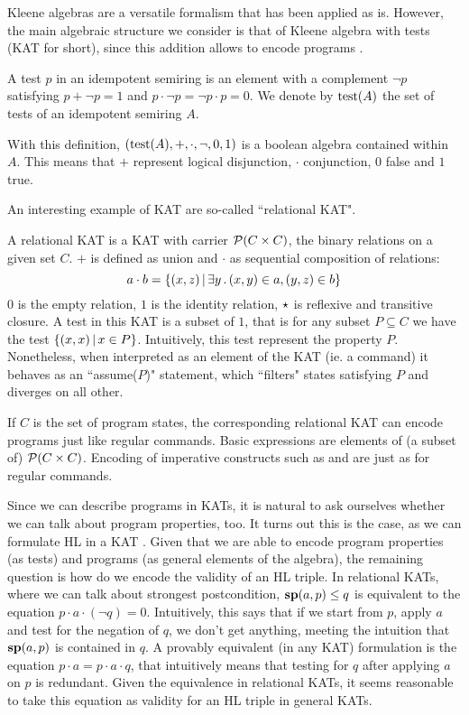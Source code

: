Kleene algebras are a versatile formalism that has been applied as is. However, the main algebraic structure we consider is that of Kleene algebra with tests (KAT for short), since this addition allows to encode programs \cite{Kozen97}.
\begin{definition}[Test]
	A test $p$ in an idempotent semiring is an element with a complement $\lnot p$ satisfying $p + \lnot p = 1$ and $p \cdot \lnot p = \lnot p \cdot p = 0$. We denote by $\text{test}(A)$ the set of tests of an idempotent semiring $A$.
\end{definition}
With this definition, $(\text{test}(A), +, \cdot, \lnot, 0, 1)$ is a boolean algebra contained within $A$. This means that $+$ represent logical disjunction, $\cdot$ conjunction, $0$ false and $1$ true.

An interesting example of KAT are so-called ``relational KAT".
\begin{example}
	A relational KAT is a KAT with carrier $\mathcal{P}(C \times C)$, the binary relations on a given set $C$. $+$ is defined as union and $\cdot$ as sequential composition of relations:
	\[
	a \cdot b = \{ (x, z) \,\vert\, \exists y \,.\, (x, y) \in a, (y, z) \in b \}
	\]
	$0$ is the empty relation, $1$ is the identity relation, $\star$ is reflexive and transitive closure. A test in this KAT is a subset of $1$, that is for any subset $P \subseteq C$ we have the test $\{ (x, x) \,\vert\, x \in P \}$. Intuitively, this test represent the property $P$. Nonetheless, when interpreted as an element of the KAT (ie. a command) it behaves as an ``assume($P$)" statement, which ``filters" states satisfying $P$ and diverges on all other.
\end{example}
If $C$ is the set of program states, the corresponding relational KAT can encode programs just like regular commands. Basic expressions are elements of (a subset of) $\mathcal{P}(C \times C)$. Encoding of imperative constructs such as  and  are just as for regular commands.

Since we can describe programs in KATs, it is natural to ask ourselves whether we can talk about program properties, too. It turns out this is the case, as we can formulate HL in a KAT \cite{Kozen00}. Given that we are able to encode program properties (as tests) and programs (as general elements of the algebra), the remaining question is how do we encode the validity of an HL triple. In relational KATs, where we can talk about strongest postcondition, $\textbf{sp}(a, p) \le q$ is equivalent to the equation $p \cdot a \cdot (\lnot q) = 0$. Intuitively, this says that if we start from $p$, apply $a$ and test for the negation of $q$, we don't get anything, meeting the intuition that $\textbf{sp}(a, p)$ is contained in $q$. A provably equivalent (in any KAT) formulation is the equation $p \cdot a = p \cdot a \cdot q$, that intuitively means that testing for $q$ after applying $a$ on $p$ is redundant. Given the equivalence in relational KATs, it seems reasonable to take this equation as validity for an HL triple in general KATs.

